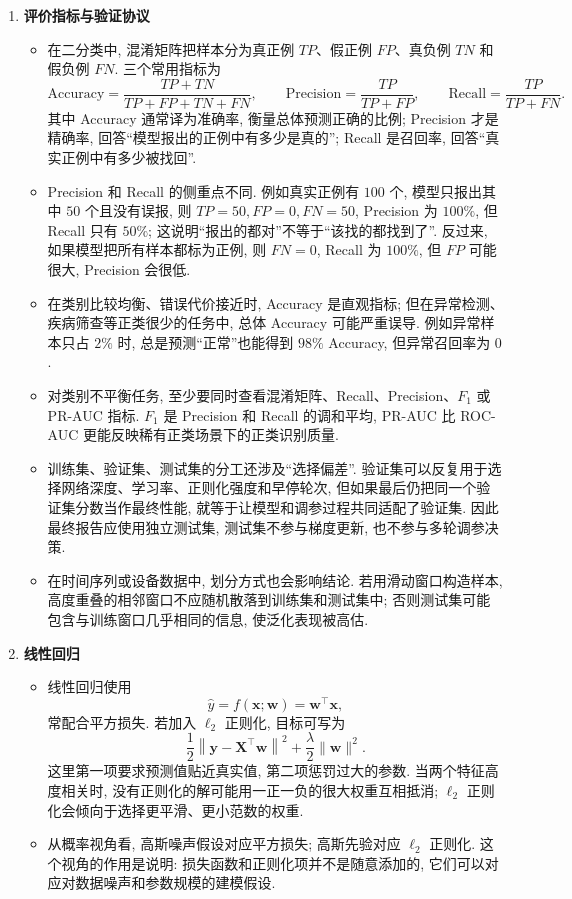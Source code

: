 \documentclass{../nndlcourse}
\begin{document}
\begin{enumerate}
    \item \textbf{评价指标与验证协议}
    \begin{itemize}
        \item 在二分类中, 混淆矩阵把样本分为真正例 $TP$、假正例 $FP$、真负例 $TN$ 和假负例 $FN$. 三个常用指标为
        \[
            \mathrm{Accuracy}
            =
            \frac{TP+TN}{TP+FP+TN+FN},
            \qquad
            \mathrm{Precision}
            =
            \frac{TP}{TP+FP},
            \qquad
            \mathrm{Recall}
            =
            \frac{TP}{TP+FN}.
        \]
        其中 Accuracy 通常译为准确率, 衡量总体预测正确的比例; Precision 才是精确率, 回答“模型报出的正例中有多少是真的”; Recall 是召回率, 回答“真实正例中有多少被找回”.
        \item Precision 和 Recall 的侧重点不同. 例如真实正例有 $100$ 个, 模型只报出其中 $50$ 个且没有误报, 则 $TP=50,FP=0,FN=50$, Precision 为 $100\%$, 但 Recall 只有 $50\%$; 这说明“报出的都对”不等于“该找的都找到了”. 反过来, 如果模型把所有样本都标为正例, 则 $FN=0$, Recall 为 $100\%$, 但 $FP$ 可能很大, Precision 会很低.
        \item 在类别比较均衡、错误代价接近时, Accuracy 是直观指标; 但在异常检测、疾病筛查等正类很少的任务中, 总体 Accuracy 可能严重误导. 例如异常样本只占 $2\%$ 时, 总是预测“正常”也能得到 $98\%$ Accuracy, 但异常召回率为 $0$.
        \item 对类别不平衡任务, 至少要同时查看混淆矩阵、Recall、Precision、$F_1$ 或 PR-AUC 指标. $F_1$ 是 Precision 和 Recall 的调和平均, PR-AUC 比 ROC-AUC 更能反映稀有正类场景下的正类识别质量.
        \item 训练集、验证集、测试集的分工还涉及“选择偏差”. 验证集可以反复用于选择网络深度、学习率、正则化强度和早停轮次, 但如果最后仍把同一个验证集分数当作最终性能, 就等于让模型和调参过程共同适配了验证集. 因此最终报告应使用独立测试集, 测试集不参与梯度更新, 也不参与多轮调参决策.
        \item 在时间序列或设备数据中, 划分方式也会影响结论. 若用滑动窗口构造样本, 高度重叠的相邻窗口不应随机散落到训练集和测试集中; 否则测试集可能包含与训练窗口几乎相同的信息, 使泛化表现被高估.
    \end{itemize}

    \item \textbf{线性回归}
    \begin{itemize}
        \item 线性回归使用
        \[
            \hat{y}=f(\boldsymbol{x};\boldsymbol{w})=\boldsymbol{w}^{\top}\boldsymbol{x},
        \]
        常配合平方损失. 若加入 $\ell_2$ 正则化, 目标可写为
        \[
            \frac{1}{2}\left\|\boldsymbol{y}-\boldsymbol{X}^{\top}\boldsymbol{w}\right\|^2
            +
            \frac{\lambda}{2}\|\boldsymbol{w}\|^2.
        \]
        这里第一项要求预测值贴近真实值, 第二项惩罚过大的参数. 当两个特征高度相关时, 没有正则化的解可能用一正一负的很大权重互相抵消; $\ell_2$ 正则化会倾向于选择更平滑、更小范数的权重.
        \item 从概率视角看, 高斯噪声假设对应平方损失; 高斯先验对应 $\ell_2$ 正则化. 这个视角的作用是说明: 损失函数和正则化项并不是随意添加的, 它们可以对应对数据噪声和参数规模的建模假设.
    \end{itemize}


\end{enumerate}
\end{document}
